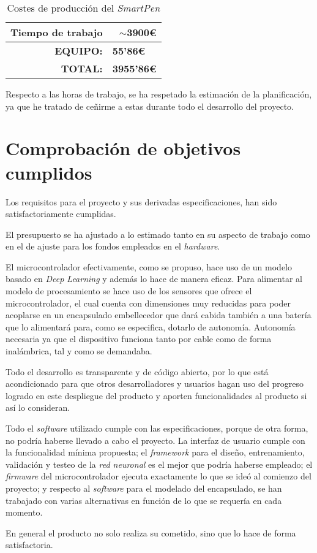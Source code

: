 \begin{table}[h]
\begin{tabular}{ll}
    \multicolumn{1}{|l|}{Tiempo de trabajo}                                                & \multicolumn{1}{r|}{$\sim$3900€}                                                             \\ \hline
    \multicolumn{1}{r}{\textbf{EQUIPO:}}                                                       & \textbf{55'86€} \\                                                                    
    \multicolumn{1}{r}{\textbf{TOTAL:}}                                                       & \textbf{3955'86€}                                                                    
    \end{tabular}
    \caption{Costes de producción del \textit{SmartPen}\label{tabPresFin}}
\end{table}

Respecto a las horas de trabajo, se ha respetado la estimación de
la planificación, ya que he tratado de ceñirme a estas durante todo el
desarrollo del proyecto.

\section{Comprobación de objetivos cumplidos}
Los requisitos para el proyecto y sus derivadas especificaciones, han sido
satisfactoriamente cumplidas.

El presupuesto se ha ajustado a lo estimado tanto en su aspecto de trabajo
como en el de ajuste para los fondos empleados en el \textit{hardware}.

El microcontrolador efectivamente, como se propuso, hace uso de un modelo
basado en \textit{Deep Learning} y además lo hace de manera eficaz. Para
alimentar al modelo de procesamiento se hace uso de los sensores que ofrece
el microcontrolador, el cual cuenta con dimensiones muy reducidas para
poder acoplarse en un encapsulado embellecedor que dará cabida también
a una batería que lo alimentará para, como se especifica, dotarlo de autonomía.
Autonomía necesaria ya que el dispositivo funciona tanto por cable
como de forma inalámbrica, tal y como se demandaba.

Todo el desarrollo es transparente y de código abierto, por lo que
está acondicionado para que otros desarrolladores y usuarios hagan uso del progreso logrado
en este despliegue del producto y aporten funcionalidades al producto
si así lo consideran.

Todo el \textit{software} utilizado cumple con las especificaciones, porque de otra forma,
no podría haberse llevado a cabo el proyecto.
La interfaz de usuario cumple con la funcionalidad mínima propuesta;
el \textit{framework} para el diseño, entrenamiento, validación y testeo
de la \textit{red neuronal} es el mejor que podría haberse empleado;
el \textit{firmware} del microcontrolador ejecuta exactamente lo que
se ideó al comienzo del proyecto; y respecto al \textit{software} para 
el modelado del encapsulado, se han trabajado con varias alternativas
en función de lo que se requería en cada momento.

En general el producto no solo realiza su cometido, sino que lo hace
de forma satisfactoria.